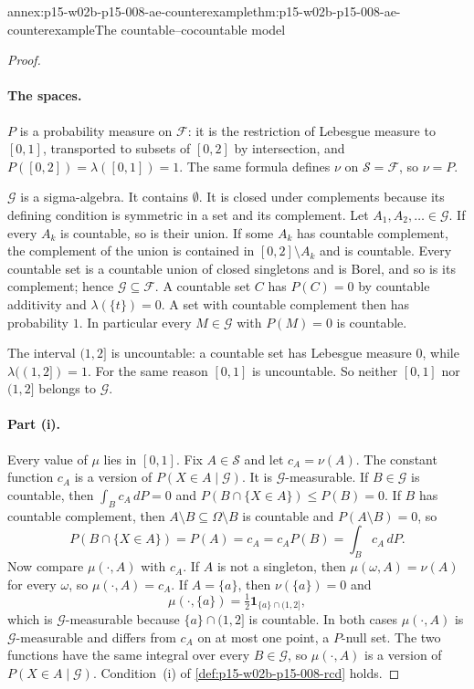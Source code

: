 \begin{annexitem}{annex:p15-w02b-p15-008-ae-counterexample}{thm:p15-w02b-p15-008-ae-counterexample}{The countable--cocountable model}
\begin{proof}
\paragraph{The spaces.}
\(P\) is a probability measure on \(\mathcal F\): it is the restriction of
Lebesgue measure to \([0,1]\), transported to subsets of \([0,2]\) by
intersection, and \(P([0,2])=\lambda([0,1])=1\). The same formula defines
\(\nu\) on \(\mathcal S=\mathcal F\), so \(\nu=P\).

\(\mathcal G\) is a sigma-algebra. It contains \(\emptyset\). It is closed
under complements because its defining condition is symmetric in a set
and its complement. Let \(A_1,A_2,\ldots\in\mathcal G\). If every
\(A_k\) is countable, so is their union. If some \(A_k\) has countable
complement, the complement of the union is contained in
\([0,2]\setminus A_k\) and is countable.
Every countable set is a countable union of closed singletons and is Borel,
and so is its complement; hence \(\mathcal G\subseteq\mathcal F\).
A countable set \(C\) has \(P(C)=0\) by countable additivity and
\(\lambda(\{t\})=0\). A set with countable complement then has
probability \(1\). In particular every \(M\in\mathcal G\) with \(P(M)=0\)
is countable.

The interval \((1,2]\) is uncountable: a countable set has Lebesgue
measure \(0\), while \(\lambda((1,2])=1\). For the same reason \([0,1]\)
is uncountable. So neither \([0,1]\) nor \((1,2]\) belongs to
\(\mathcal G\).

\paragraph{Part (i).}
Every value of \(\mu\) lies in \([0,1]\). Fix \(A\in\mathcal S\) and let
\(c_A=\nu(A)\). The constant function \(c_A\) is a version of
\(P(X\in A\mid\mathcal G)\). It is \(\mathcal G\)-measurable. If
\(B\in\mathcal G\) is countable, then \(\int_Bc_A\,dP=0\) and
\(P(B\cap\{X\in A\})\leq P(B)=0\). If \(B\) has countable complement, then
\(A\setminus B\subseteq\Omega\setminus B\) is countable and
\(P(A\setminus B)=0\), so
\[
 P(B\cap\{X\in A\})=P(A)=c_A=c_AP(B)=\int_Bc_A\,dP .
\]
Now compare \(\mu(\cdot,A)\) with \(c_A\). If \(A\) is not a singleton,
then \(\mu(\omega,A)=\nu(A)\) for every \(\omega\), so
\(\mu(\cdot,A)=c_A\). If \(A=\{a\}\), then \(\nu(\{a\})=0\) and
\[
 \mu(\cdot,\{a\})=\tfrac12\mathbf1_{\{a\}\cap(1,2]},
\]
which is \(\mathcal G\)-measurable because \(\{a\}\cap(1,2]\) is
countable. In both cases \(\mu(\cdot,A)\) is \(\mathcal G\)-measurable and
differs from \(c_A\) on at most one point, a \(P\)-null set. The two
functions have the same integral over every \(B\in\mathcal G\), so
\(\mu(\cdot,A)\) is a version of \(P(X\in A\mid\mathcal G)\). Condition~(i)
of \cref{def:p15-w02b-p15-008-rcd} holds.


\end{proof}
\end{annexitem}
